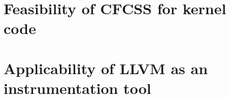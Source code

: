 
\section{Feasibility of CFCSS for kernel code}


\section{Applicability of LLVM as an instrumentation tool}

